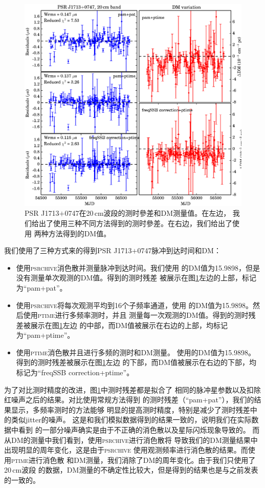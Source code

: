 \begin{figure}
\center
\includegraphics[width=4.5 in]{1713.ps}
\caption{PSR J1713$+$0747在20\,cm波段的测时參差和DM测量值。在左边，
我们给出了使用三种不同方法得到的测时參差。在右边，我们给出了使用
两种方法得到的DM值。
}
\label{1713resi}
\end{figure}

我们使用了三种方式来的得到PSR J1713$+$0747脉冲到达时间和DM：
\begin{itemize}
\item 使用\textsc{psrchive}消色散并测量脉冲到达时间。我们使用
的DM值为15.9898，但是没有测量单次观测的DM值。得到的测时残差
被展示在图\ref{1713resi}左边的上部，标记为“pam+pat”。
\item 使用\textsc{psrchive}将每次观测平均到16个子频率通道，使用
的DM值为15.9898。然后使用\textsc{ptime}进行多频率测时，并且
测量每一次观测的DM值。得到的测时残差被展示在图\ref{1713resi}左边
的中部，而DM值被展示在右边的上部，均标记为“pam+ptime”。
\item 使用\textsc{ptime}消色散并且进行多频的测时和DM测量。
使用的DM值为15.9898。得到的测时残差被展示在图\ref{1713resi}左边
的下部，而DM值被展示在右边的下部，均标记为“freqSSB correction+ptime”。
\end{itemize}

为了对比测时精度的改进，图\ref{1713resi}中测时残差都是拟合了
相同的脉冲星参数以及扣除红噪声之后的结果。对比使用常规方法得到
的测时残差（“pam+pat”），我们的结果显示，多频率测时的方法能够
明显的提高测时精度，特别是减少了测时残差中的类似jitter的噪声。
这是和我们模拟数据得到的结果一致的，说明我们在实际数据中看到
的一部分噪声确实是由于不正确的消色散以及星际闪烁现象导致的。
而从DM的测量中我们看到，使用\textsc{psrchive}进行消色散将
导致我们的DM测量结果中出现明显的周年变化，这是由于\textsc{psrchive}
使用观测频率进行消色散的结果。而使用\textsc{ptime}进行消色散
和DM测量，我们消除了DM的周年变化。由于我们只使用了20\,cm波段
的数据，DM测量的不确定性比较大，但是得到的结果也是与之前发表
的一致的。


